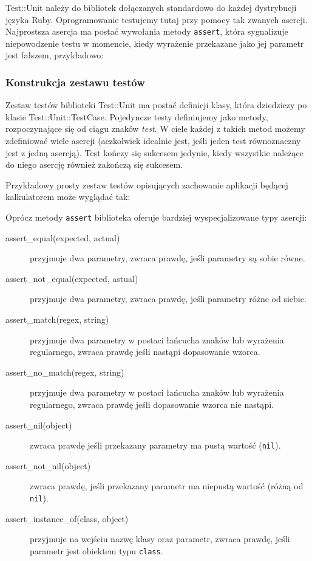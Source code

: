     Test::Unit należy do bibliotek dołączanych standardowo do każdej dystrybucji języka Ruby. Oprogramowanie testujemy tutaj przy pomocy tak zwanych asercji. Najprostsza asercja ma postać wywołania metody \verb+assert+, która sygnalizuje niepowodzenie testu w momencie, kiedy wyrażenie przekazane jako jej parametr jest fałszem, przykładowo:
    
    
     
     \subsubsection{Konstrukcja zestawu testów}
     Zestaw testów biblioteki Test::Unit ma postać definicji klasy, która dziedziczy po klasie Test::Unit::TestCase. Pojedyncze testy definiujemy jako metody, rozpoczynające się od ciągu znaków \emph{test}. W ciele każdej z takich metod możemy zdefiniować wiele asercji (aczkolwiek idealnie jest, jeśli jeden test równoznaczny jest z jedną asercją). Test kończy się sukcesem jedynie, kiedy wszystkie należące do niego asercję również zakończą się sukcesem.
     
     Przykładowy prosty zestaw testów opisujących zachowanie aplikacji będącej kalkulatorem może wyglądać tak:
     
     
     
     Oprócz metody \verb+assert+ biblioteka oferuje bardziej wyspecjalizowane typy asercji:
     
     \begin{description}
       \item[assert\_equal(expected, actual)] przyjmuje dwa parametry, zwraca prawdę, jeśli parametry są sobie równe.
       \item[assert\_not\_equal(expected, astual)] przyjmuje dwa parametry, zwraca prawdę, jeśli parametry różne od siebie.
       \item[assert\_match(regex, string)] przyjmuje dwa parametry w postaci łańcucha znaków lub wyrażenia regularnego, zwraca prawdę jeśli nastąpi dopasowanie wzorca.
       \item[assert\_no\_match(regex, string)] przyjmuje dwa parametry w postaci łańcucha znaków lub wyrażenia regularnego, zwraca prawdę jeśli dopasowanie wzorca nie nastąpi.
       \item[assert\_nil(object)] zwraca prawdę jeśli przekazany parametry ma pustą wartość (\verb+nil+).
       \item[assert\_not\_nil(object)] zwraca prawdę, jeśli przekazany parametr ma niepustą wartość (różną od \verb+nil+).
       \item[assert\_instance\_of(class, object)] przyjmuje na wejściu nazwę klasy oraz parametr, zwraca prawdę, jeśli parametr jest obiektem typu \verb+class+.
    \end{description}
    
